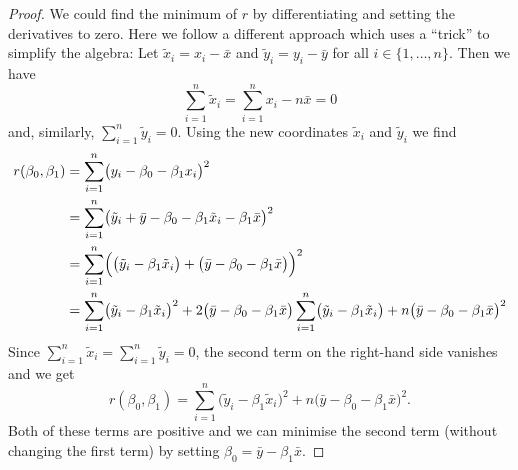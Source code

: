 \documentclass[
  a4paper,
]{article}
\theoremstyle{definition}
\theoremstyle{definition}
\theoremstyle{definition}
\theoremstyle{definition}
\theoremstyle{remark}
\begin{document}
\begin{proof}
We could find the minimum of \(r\) by differentiating and setting the
derivatives to zero. Here we follow a different approach which uses
a ``trick'' to simplify the algebra: Let \(\tilde x_i = x_i - \bar x\)
and \(\tilde y_i = y_i - \bar y\) for all \(i \in \{1, \ldots, n\}\).
Then we have
\begin{equation*}
    \sum_{i=1}^n \tilde x_i
    = \sum_{i=1}^n x_i - n \bar x
    = 0
  \end{equation*}
and, similarly, \(\sum_{i=1}^n \tilde y_i = 0\). Using the new
coordinates \(\tilde x_i\) and \(\tilde y_i\) we find
\begin{align*}
    r(\beta_0, \beta_1)
    &= \sum_{i=1}^n \bigl(y_i - \beta_0 - \beta_1 x_i \bigr)^2 \\
    &= \sum_{i=1}^n \bigl( \tilde y_i + \bar y - \beta_0 - \beta_1 \tilde x_i - \beta_1 \bar x \bigr)^2 \\
    &= \sum_{i=1}^n \Bigl( \bigl( \tilde y_i - \beta_1 \tilde x_i \bigr)
    + \bigl( \bar y - \beta_0 - \beta_1 \bar x \bigr) \Bigr)^2 \\
    &= \sum_{i=1}^n \bigl( \tilde y_i - \beta_1 \tilde x_i \bigr)^2
    + 2 \bigl( \bar y - \beta_0 - \beta_1 \bar x \bigr) \sum_{i=1}^n \bigl( \tilde y_i - \beta_1 \tilde x_i \bigr)
    + n \bigl( \bar y - \beta_0 - \beta_1 \bar x \bigr)^2
  \end{align*}
Since \(\sum_{i=1}^n \tilde x_i = \sum_{i=1}^n \tilde y_i = 0\), the
second term on the right-hand side vanishes and we get
\begin{equation}
    r(\beta_0, \beta_1)
    = \sum_{i=1}^n \bigl( \tilde y_i - \beta_1 \tilde x_i \bigr)^2
    + n \bigl( \bar y - \beta_0 - \beta_1 \bar x \bigr)^2.  \label{eq:RSS-rewrite}
  \end{equation}
Both of these terms are positive and we can minimise the second term
(without changing the first term) by setting
\(\beta_0 = \bar y - \beta_1 \bar x\).


\end{proof}
\end{document}
